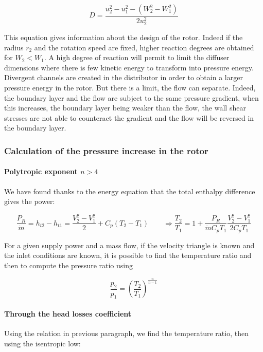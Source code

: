 \begin{equation}
D = \frac{u_2^2-u_1^2 - (W_2^2- W_1^2)}{2u_2^2}
\end{equation}

This equation gives information about the design of the rotor. Indeed if the radius $r_2$ and the rotation speed are fixed, higher reaction degrees are obtained for $W_2<W_1$. A high degree of reaction will permit to limit the diffuser dimensions where there is few kinetic energy to transform into pressure energy. \\

Divergent channels are created in the distributor in order to obtain a larger pressure energy in the rotor. But there is a limit, the flow can separate. Indeed, the boundary layer and the flow are subject to the same pressure gradient, when this increases, the boundary layer being weaker than the flow, the wall shear stresses are not able to counteract the gradient and the flow will be reversed in the boundary layer. 

\subsubsection{Calculation of the pressure increase in the rotor}
\paragraph{Polytropic exponent $n>4$}
We have found thanks to the energy equation that the total enthalpy difference gives the power: 

\begin{equation}
\frac{P_R}{\dot{m}} = h_{t2}-h_{t1} = \frac{V_2^2-V_1^2}{2} + C_p (T_2-T_1)\qquad \Rightarrow \frac{T_2}{T_1} = 1 + \frac{P_R}{\dot{m}C_pT_1}\frac{V_2^2-V_1^2}{2C_pT_1}
\end{equation}

For a given supply power and a mass flow, if the velocity triangle is known and the inlet conditions are known, it is possible to find the temperature ratio and then to compute the pressure ratio using

\begin{equation}
\frac{p_2}{p_1} = \left(\frac{T_2}{T_1}\right)^{\frac{n}{n-1}}
\end{equation}

\paragraph{Through the head losses coefficient}
Using the relation in previous paragraph, we find the temperature ratio, then using the isentropic low: 

